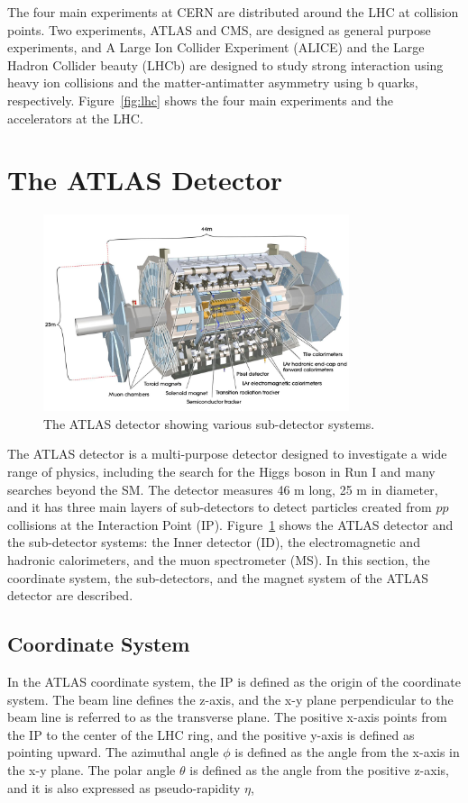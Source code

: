 The four main experiments at CERN are distributed around the LHC at collision points. Two experiments, ATLAS and CMS, are designed as general purpose experiments, and A Large Ion Collider Experiment (ALICE) and the Large Hadron Collider beauty (LHCb) are designed to study strong interaction using heavy ion collisions and the matter-antimatter asymmetry using b quarks, respectively. Figure~\ref{fig:lhc} shows the four main experiments and the accelerators at the LHC.


\section{The ATLAS Detector}
\label{sec:atlas:detector}

\begin{figure}[!htb]
    \includegraphics[width=0.8\textwidth]{figures/atlas.png}
    \centering
    \caption{The ATLAS detector showing various sub-detector systems.}
    \label{fig:atlas}
\end{figure}

The ATLAS detector is a multi-purpose detector designed to investigate a wide range of physics, including the search for the Higgs boson in Run I and many searches beyond the SM. The detector measures 46 m long, 25 m in diameter, and it has three main layers of sub-detectors to detect particles created from $pp$ collisions at the Interaction Point (IP). Figure~\ref{fig:atlas} shows the ATLAS detector and the sub-detector systems: the Inner detector (ID), the electromagnetic and hadronic calorimeters, and the muon spectrometer (MS). In this section, the coordinate system, the sub-detectors, and the magnet system of the ATLAS detector are described.

\subsection{Coordinate System}
\label{sec:atlas:coordinate}
In the ATLAS coordinate system, the IP is defined as the origin of the coordinate system. The beam line defines the z-axis, and the x-y plane perpendicular to the beam line is referred to as the transverse plane. The positive x-axis points from the IP to the center of the LHC ring, and the positive y-axis is defined as pointing upward. The azimuthal angle $\phi$ is defined as the angle from the x-axis in the x-y plane. The polar angle $\theta$ is defined as the angle from the positive z-axis, and it is also expressed as pseudo-rapidity $\eta$,

